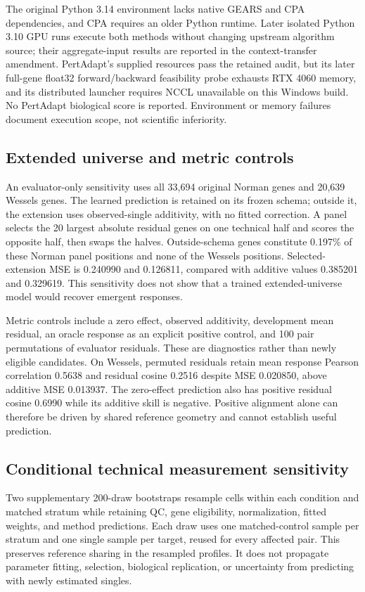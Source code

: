 \documentclass{article}
\begin{document}
The original Python 3.14 environment lacks native GEARS and CPA dependencies, and CPA requires an older Python runtime. Later isolated Python 3.10 GPU runs execute both methods without changing upstream algorithm source; their aggregate-input results are reported in the context-transfer amendment. PertAdapt's supplied resources pass the retained audit, but its later full-gene float32 forward/backward feasibility probe exhausts RTX 4060 memory, and its distributed launcher requires NCCL unavailable on this Windows build. No PertAdapt biological score is reported. Environment or memory failures document execution scope, not scientific inferiority.

\subsection{Extended universe and metric controls}
An evaluator-only sensitivity uses all 33,694 original Norman genes and 20,639 Wessels genes. The learned prediction is retained on its frozen schema; outside it, the extension uses observed-single additivity, with no fitted correction. A panel selects the 20 largest absolute residual genes on one technical half and scores the opposite half, then swaps the halves. Outside-schema genes constitute 0.197\% of these Norman panel positions and none of the Wessels positions. Selected-extension MSE is 0.240990 and 0.126811, compared with additive values 0.385201 and 0.329619. This sensitivity does not show that a trained extended-universe model would recover emergent responses.

Metric controls include a zero effect, observed additivity, development mean residual, an oracle response as an explicit positive control, and 100 pair permutations of evaluator residuals. These are diagnostics rather than newly eligible candidates. On Wessels, permuted residuals retain mean response Pearson correlation 0.5638 and residual cosine 0.2516 despite MSE 0.020850, above additive MSE 0.013937. The zero-effect prediction also has positive residual cosine 0.6990 while its additive skill is negative. Positive alignment alone can therefore be driven by shared reference geometry and cannot establish useful prediction.

\subsection{Conditional technical measurement sensitivity}
Two supplementary 200-draw bootstraps resample cells within each condition and matched stratum while retaining QC, gene eligibility, normalization, fitted weights, and method predictions. Each draw uses one matched-control sample per stratum and one single sample per target, reused for every affected pair. This preserves reference sharing in the resampled profiles. It does not propagate parameter fitting, selection, biological replication, or uncertainty from predicting with newly estimated singles.
\end{document}
